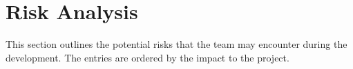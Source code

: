 \chapter{Risk Analysis}
This section outlines the potential risks that the team may encounter during the development. The entries are ordered by the impact to the project.
